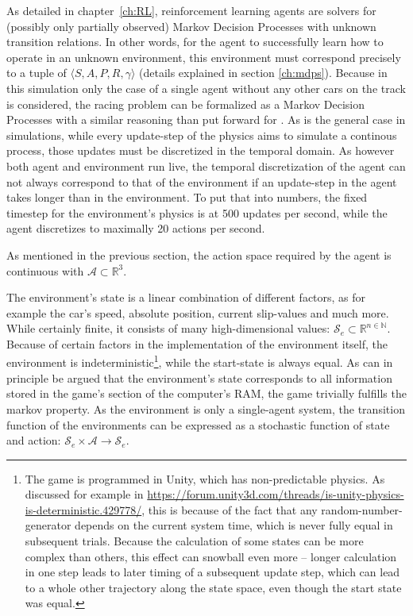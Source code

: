As detailed in chapter~\ref{ch:RL}, reinforcement learning agents are solvers for (possibly only partially observed) Markov Decision Processes with unknown transition relations. In other words, for the agent to successfully learn how to operate in an unknown environment, this environment must correspond precisely to a tuple of $\langle S, A, P, R, \gamma \rangle$ (details explained in section \ref{ch:mdps}). Because in this simulation only the case of a single agent without any other cars on the track is considered, the racing problem can be formalized as a Markov Decision Processes with a similar reasoning than \citet[chapter 4]{wymann_torcs_2000} put forward for . As is the general case in simulations, while every update-step of the physics aims to simulate a continous process, those updates must be discretized in the temporal domain. As however both agent and environment run live, the temporal discretization of the agent can not always correspond to that of the environment if an update-step in the agent takes longer than in the environment. To put that into numbers, the fixed timestep for the environment's physics is at 500 updates per second, while the agent discretizes to maximally 20 actions per second.

As mentioned in the previous section, the action space required by the agent is continuous with $\mathcal{A} \subset \mathds{R}^3$. 

The environment's state is a linear combination of different factors, as for example the car's speed, absolute position, current slip-values and much more. While certainly finite, it consists of many high-dimensional values: $\mathcal{S}_e \subset \mathds{R}^{n \in \mathds{N}}$. Because of certain factors in the implementation of the environment itself, the environment is indeterministic\footnote{The game is programmed in Unity, which has non-predictable physics. As discussed for example in \url{https://forum.unity3d.com/threads/is-unity-physics-is-deterministic.429778/}, this is because of the fact that any random-number-generator depends on the current system time, which is never fully equal in subsequent trials. Because the calculation of some states can be more complex than others, this effect can snowball even more -- longer calculation in one step leads to later timing of a subsequent update step, which can lead to a whole other trajectory along the state space, even though the start state was equal.}, while the start-state is always equal. As can in principle be argued that the environment's state corresponds to all information stored in the game's section of the computer's RAM, the game trivially fulfills the markov property. As the environment is only a single-agent system, the transition function of the environments can be expressed as a stochastic function of state and action: $\mathcal{S}_e \times \mathcal{A} \rightarrow \mathcal{S}_e$.


